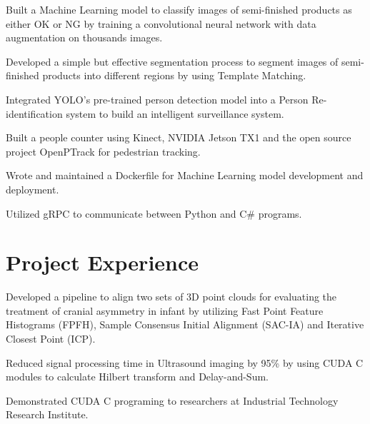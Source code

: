 \documentclass[]{deedy-resume}
\begin{document}
\begin{minipage}[t]{0.66\textwidth}
\begin{tightemize}
\item Built a Machine Learning model to classify images of semi-finished products as either OK or NG 
by training a convolutional neural network with data augmentation on thousands images.
\item Developed a simple but effective segmentation process to segment images of semi-finished products into different regions by using Template Matching.
\item Integrated YOLO's pre-trained person detection model into a Person Re-identification system to build an intelligent surveillance system.
\item Built a people counter using Kinect, NVIDIA Jetson TX1 and the open source project OpenPTrack for pedestrian tracking.
\item Wrote and maintained a Dockerfile for Machine Learning model development and deployment.
\item Utilized gRPC to communicate between Python and C\# programs.
\end{tightemize}

\section{Project Experience}

\begin{tightemize}
\item Developed a pipeline to align two sets of 3D point clouds for evaluating the treatment of cranial asymmetry in infant
by utilizing Fast Point Feature Histograms (FPFH), Sample Consensus Initial Alignment (SAC-IA) and Iterative Closest Point (ICP).
\end{tightemize}
\sectionsep

\begin{tightemize}
\item Reduced signal processing time in Ultrasound imaging by 95\% by using CUDA C modules to calculate Hilbert transform and Delay-and-Sum.
\item Demonstrated CUDA C programing to researchers at Industrial Technology Research Institute.
\end{tightemize}

\end{minipage}
\end{document}
